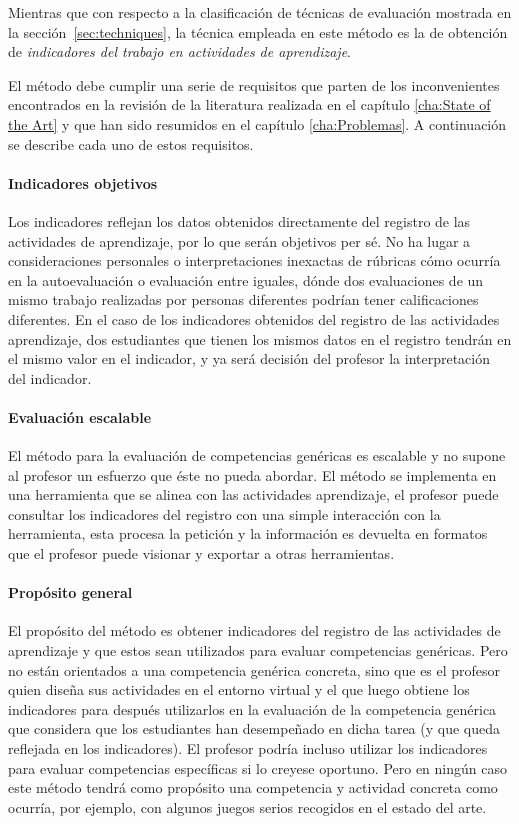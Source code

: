 Mientras que con respecto a la clasificación de técnicas de evaluación mostrada en la sección~\ref{sec:techniques}, la técnica empleada en este método es la de obtención de \emph{indicadores del trabajo en actividades de aprendizaje}.

El método debe cumplir una serie de requisitos que parten de los inconvenientes encontrados en la revisión de la literatura realizada en el capítulo \ref{cha:State of the Art} y que han sido resumidos en el capítulo \ref{cha:Problemas}. A continuación se describe cada uno de estos requisitos.

\paragraph*{Indicadores objetivos}

Los indicadores reflejan los datos obtenidos directamente del registro de las actividades de aprendizaje, por lo que serán objetivos per sé. No ha lugar a consideraciones personales o interpretaciones inexactas de rúbricas cómo ocurría en la autoevaluación o evaluación entre iguales, dónde dos evaluaciones de un mismo trabajo realizadas por personas diferentes podrían tener calificaciones diferentes. En el caso de los indicadores obtenidos del registro de las actividades aprendizaje, dos estudiantes que tienen los mismos datos en el registro tendrán en el mismo valor en el indicador, y ya será decisión del profesor la interpretación del indicador.

\paragraph*{Evaluación escalable}

El método para la evaluación de competencias genéricas es escalable y no supone al profesor un esfuerzo que éste no pueda abordar. El método se implementa en una herramienta que se alinea con las actividades aprendizaje, el profesor puede consultar los indicadores del registro con una simple interacción con la herramienta, esta procesa la petición y la información es devuelta en formatos que el profesor puede visionar y exportar a otras herramientas.

\paragraph*{Propósito general}

El propósito del método es obtener indicadores del registro de las actividades de aprendizaje y que estos sean utilizados para evaluar competencias genéricas. Pero no están orientados a una competencia genérica concreta, sino que es el profesor quien diseña sus actividades en el entorno virtual y el que luego obtiene los indicadores para después utilizarlos en la evaluación de la competencia genérica que considera que los estudiantes han desempeñado en dicha tarea (y que queda reflejada en los indicadores). El profesor podría incluso utilizar los indicadores para evaluar competencias específicas si lo creyese oportuno. Pero en ningún caso este método tendrá como propósito una competencia y actividad concreta como ocurría, por ejemplo, con algunos juegos serios recogidos en el estado del arte.

